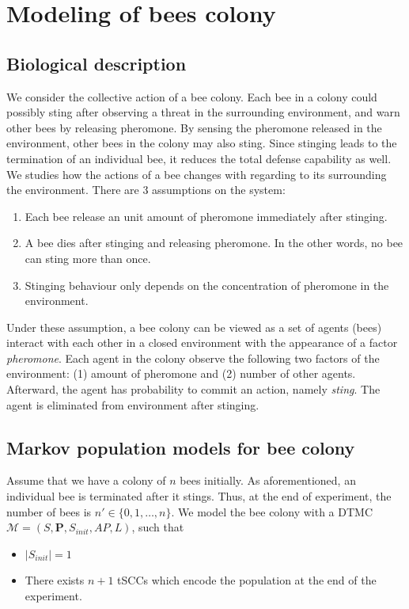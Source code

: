 \documentclass[12pt]{article}
\theoremstyle{definition}
\begin{document}
\section{Modeling of bees colony}
\subsection{Biological description}
We consider the collective action of a bee colony. Each bee in a colony could
possibly sting after observing a threat in the surrounding environment, and warn
other bees by releasing pheromone. By sensing the pheromone released in the
environment, other bees in the colony may also sting. Since stinging leads to
the termination of an individual bee, it reduces the total defense capability as
well. We studies how the actions of a bee changes with regarding to its
surrounding the environment. There are 3 assumptions on the system:
\begin{enumerate}
\item Each bee release an unit amount of pheromone immediately after stinging.
\item A bee dies after stinging and releasing pheromone. In the other words, no
  bee can sting more than once.
\item Stinging behaviour only depends on the concentration of pheromone in the
  environment.
\end{enumerate}
Under these assumption, a bee colony can be viewed as a set of agents (bees)
interact with each other in a closed environment with the appearance of a factor
\textit{pheromone}. Each agent in the colony observe the following two factors
of the environment: (1) amount of pheromone and (2) number of other agents.
Afterward, the agent has probability to commit an action, namely \textit{sting}.
The agent is eliminated from environment after stinging.\\

\subsection{Markov population models for bee colony}
Assume that we have a colony of $n$ bees initially. As aforementioned, an individual bee
is terminated after it stings. Thus, at the end of experiment, the number of
bees is $n'\in\{0,1,\ldots,n\}$. We model the bee colony with a DTMC
$\mathcal{M}=(S,\mathbf{P}, S_{init}, AP,L)$, such that
\begin{itemize}
\item $|S_{init}|=1$
\item There exists $n+1$ tSCCs which encode the population at the end of the experiment.
\end{itemize}
\end{document}

